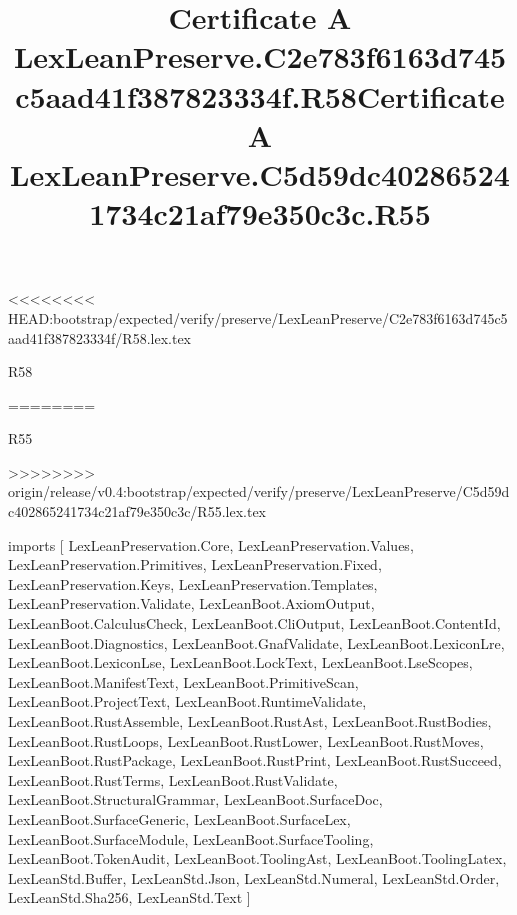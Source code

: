 <<<<<<<< HEAD:bootstrap/expected/verify/preserve/LexLeanPreserve/C2e783f6163d745c5aad41f387823334f/R58.lex.tex
\begin{lexlean}{R58}
\title{Certificate A LexLeanPreserve.C2e783f6163d745c5aad41f387823334f.R58}
========
\begin{lexlean}{R55}
\title{Certificate A LexLeanPreserve.C5d59dc402865241734c21af79e350c3c.R55}
>>>>>>>> origin/release/v0.4:bootstrap/expected/verify/preserve/LexLeanPreserve/C5d59dc402865241734c21af79e350c3c/R55.lex.tex
\begin{coremodule}
imports [
  LexLeanPreservation.Core,
  LexLeanPreservation.Values,
  LexLeanPreservation.Primitives,
  LexLeanPreservation.Fixed,
  LexLeanPreservation.Keys,
  LexLeanPreservation.Templates,
  LexLeanPreservation.Validate,
  LexLeanBoot.AxiomOutput,
  LexLeanBoot.CalculusCheck,
  LexLeanBoot.CliOutput,
  LexLeanBoot.ContentId,
  LexLeanBoot.Diagnostics,
  LexLeanBoot.GnafValidate,
  LexLeanBoot.LexiconLre,
  LexLeanBoot.LexiconLse,
  LexLeanBoot.LockText,
  LexLeanBoot.LseScopes,
  LexLeanBoot.ManifestText,
  LexLeanBoot.PrimitiveScan,
  LexLeanBoot.ProjectText,
  LexLeanBoot.RuntimeValidate,
  LexLeanBoot.RustAssemble,
  LexLeanBoot.RustAst,
  LexLeanBoot.RustBodies,
  LexLeanBoot.RustLoops,
  LexLeanBoot.RustLower,
  LexLeanBoot.RustMoves,
  LexLeanBoot.RustPackage,
  LexLeanBoot.RustPrint,
  LexLeanBoot.RustSucceed,
  LexLeanBoot.RustTerms,
  LexLeanBoot.RustValidate,
  LexLeanBoot.StructuralGrammar,
  LexLeanBoot.SurfaceDoc,
  LexLeanBoot.SurfaceGeneric,
  LexLeanBoot.SurfaceLex,
  LexLeanBoot.SurfaceModule,
  LexLeanBoot.SurfaceTooling,
  LexLeanBoot.TokenAudit,
  LexLeanBoot.ToolingAst,
  LexLeanBoot.ToolingLatex,
  LexLeanStd.Buffer,
  LexLeanStd.Json,
  LexLeanStd.Numeral,
  LexLeanStd.Order,
  LexLeanStd.Sha256,
  LexLeanStd.Text
]


\end{coremodule}
\end{lexlean}
\end{lexlean}
